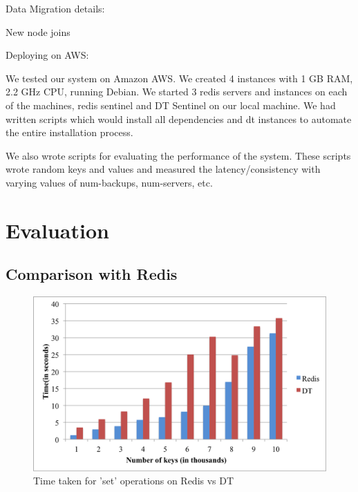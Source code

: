 \documentclass[10pt,twocolumn,letterpaper]{article}
\begin{document}
Data Migration details: 

New node joins


Deploying on AWS:

We tested our system on Amazon AWS. We created 4 instances with 1 GB RAM, 2.2 GHz CPU, running Debian. We started 3 redis servers and instances on each of the machines, redis sentinel  and DT Sentinel on our local machine. We had written scripts which would install all dependencies and dt instances to automate the entire installation process.

We also wrote scripts for evaluating the performance of the system. These scripts wrote random keys and values and measured the latency/consistency with varying values of num-backups, num-servers, etc.


\section{Evaluation} \label{evaluation}

\subsection{Comparison with Redis}
\begin{figure}[hbt]
 \centering
 \includegraphics[scale=0.36]{bar_graph}
 \caption{Time taken for 'set' operations on Redis vs DT}
 \label{redisvsDT}
\end{figure}
\end{document}
